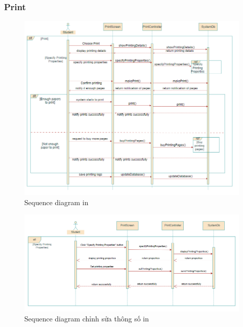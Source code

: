\documentclass[a4paper]{article}
\begin{document}
\subsubsection{Print}
\begin{figure}[h!]
\begin{center}
\includegraphics[width=16cm]{picture/Sequence_diagram_print.drawio.png}
\caption{Sequence diagram in}
\end{center}
\end{figure}
\clearpage
\begin{figure}[h!]
\begin{center}
\includegraphics[width=16cm]{picture/Sequence_diagram_specifyprintingproperties.drawio.png}
\caption{Sequence diagram chỉnh sửa thông số in}
\end{center}
\end{figure}
\end{document}
